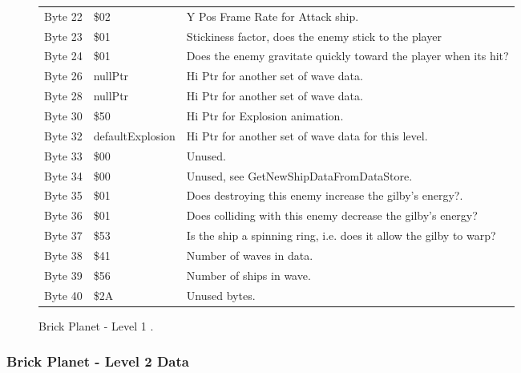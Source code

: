 \begin{figure}[H]
{\begin{adjustbox}{width=12cm}
\begin{tabular}{lll}
 Byte 22 & \$02               & Y Pos Frame Rate for Attack ship.                                  \\
 Byte 23 & \$01               & Stickiness factor, does the enemy stick to the player              \\
 Byte 24 & \$01               & Does the enemy gravitate quickly toward the player when its hit?   \\
 Byte 26 & nullPtr           & Hi Ptr for another set of wave data.                               \\
 Byte 28 & nullPtr           & Hi Ptr for another set of wave data.                               \\
 Byte 30 & \$50               & Hi Ptr for Explosion animation.                                    \\
 Byte 32 & defaultExplosion  & Hi Ptr for another set of wave data for this level.                \\
 Byte 33 & \$00               & Unused.                                                            \\
 Byte 34 & \$00               & Unused, see GetNewShipDataFromDataStore.                           \\
 Byte 35 & \$01               & Does destroying this enemy increase the gilby's energy?.           \\
 Byte 36 & \$01               & Does colliding with this enemy decrease the gilby's energy?        \\
 Byte 37 & \$53               & Is the ship a spinning ring, i.e. does it allow the gilby to warp? \\
 Byte 38 & \$41               & Number of waves in data.                                           \\
 Byte 39 & \$56               & Number of ships in wave.                                           \\
 Byte 40 & \$2A               & Unused bytes.                                                      \\
\bottomrule
\end{tabular}

  \end{adjustbox}

  }\caption*{Brick Planet - Level 1
.}
\end{figure}

\clearpage
\subsubsection{Brick Planet - Level 2 Data}

